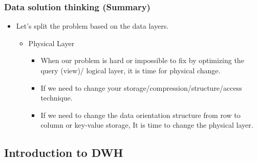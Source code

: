 \begin{frame}
  \frametitle{Data solution thinking (Summary) }
  \begin{itemize}[<+->]
  \item Let's split the problem based on the data layers.
    \begin{itemize}[<+->]
    \item Physical Layer
      \begin{itemize}[<+->]
      \item When our problem is hard or impossible to fix by optimizing the query (view)/ logical layer, it is time for physical change.
      \item If we need to change your storage/compression/structure/access technique.
      \item If we need to change the data orientation structure from row to column or key-value storage, It is time to change the physical layer.
      \end{itemize}
    \end{itemize}
  \end{itemize}
 \end{frame}
\VideoClassification[column=2, colour=blue]
\subsection{Introduction to DWH}

